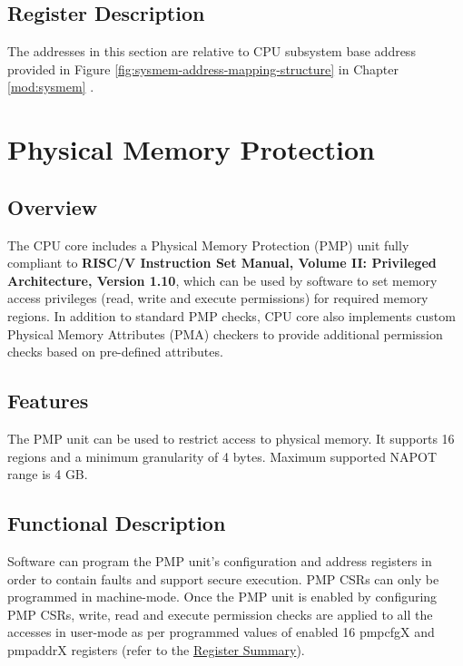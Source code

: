 \documentclass[main\_\_EN.tex]{subfiles}
\begin{document}

\subsection{Register Description}

The addresses in this section are relative to CPU subsystem base address provided in Figure \ref{fig:sysmem-address-mapping-structure} in Chapter \ref{mod:sysmem} \textit{}.





\clearpage
\section{Physical Memory Protection}
\label{sec:riscvcpu-pmp}

\subsection{Overview}
\label{sec:riscvcpu-pmp-overview}
The CPU core includes a Physical Memory Protection (PMP) unit fully compliant to \textbf{RISC\-/V Instruction Set Manual, Volume II: Privileged Architecture, Version 1.10}, which can be used by software to set memory access privileges (read, write and execute permissions) for required memory regions. In addition to standard PMP checks, CPU core also implements custom Physical Memory Attributes (PMA) checkers to provide additional permission checks based on pre-defined attributes.

\subsection{Features}
\label{sec:riscvcpu-pmp-features}
The PMP unit can be used to restrict access to physical memory. It supports 16 regions and a minimum granularity of 4 bytes. Maximum supported NAPOT range is 4 GB.

\subsection{Functional Description}
\label{sec:riscvcpu-pmp-func-descr}

Software can program the PMP unit's configuration and address registers in order to contain faults and support secure execution. PMP CSRs can only be programmed in machine-mode. Once the PMP unit is enabled by configuring PMP CSRs, write, read and execute permission checks are applied to all the accesses in user-mode as per programmed values of enabled 16 pmpcfgX and pmpaddrX registers (refer to the \hyperref[sec:riscvcpu-pmp-reg-summ]{Register Summary}).
\end{document}

